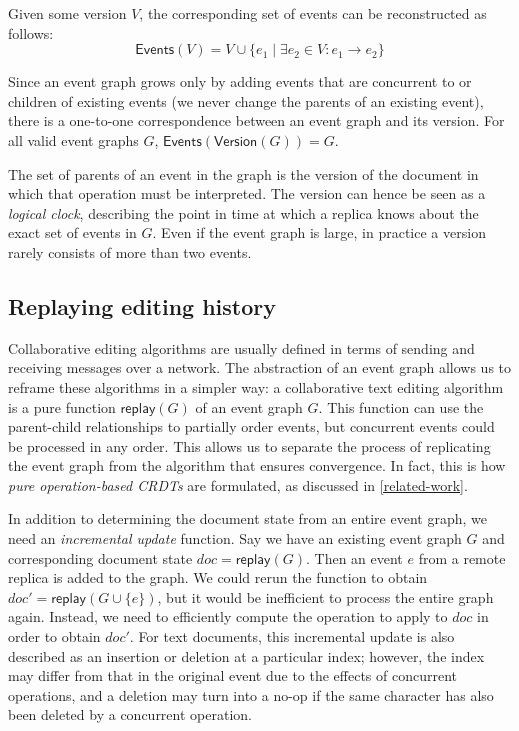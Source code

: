 \documentclass[sigplan,10pt]{acmart}
\begin{document}
Given some version $V$, the corresponding set of events can be reconstructed as follows:
\begin{equation*}
  \mathsf{Events}(V) = V \cup \{e_1 \mid \exists e_2 \in V : e_1 \rightarrow e_2\}
\end{equation*}

Since an event graph grows only by adding events that are concurrent to or children of existing events (we never change the parents of an existing event), there is a one-to-one correspondence between an event graph and its version.
For all valid event graphs $G$, $\mathsf{Events}(\mathsf{Version}(G)) = G$.

The set of parents of an event in the graph is the version of the document in which that operation must be interpreted.
The version can hence be seen as a \emph{logical clock}, describing the point in time at which a replica knows about the exact set of events in $G$.
Even if the event graph is large, in practice a version rarely consists of more than two events.

\subsection{Replaying editing history}\label{replay}

Collaborative editing algorithms are usually defined in terms of sending and receiving messages over a network.
The abstraction of an event graph allows us to reframe these algorithms in a simpler way: a collaborative text editing algorithm is a pure function $\mathsf{replay}(G)$ of an event graph $G$.
This function can use the parent-child relationships to partially order events, but concurrent events could be processed in any order.
This allows us to separate the process of replicating the event graph from the algorithm that ensures convergence.
In fact, this is how \emph{pure operation-based CRDTs} \cite{polog} are formulated, as discussed in \autoref{related-work}.

In addition to determining the document state from an entire event graph, we need an \emph{incremental update} function.
Say we have an existing event graph $G$ and corresponding document state $\mathit{doc} = \mathsf{replay}(G)$. Then an event $e$ from a remote replica is added to the graph.
We could rerun the function to obtain $\mathit{doc}' = \mathsf{replay}(G \cup \{e\})$, but it would be inefficient to process the entire graph again.
Instead, we need to efficiently compute the operation to apply to $\mathit{doc}$ in order to obtain $\mathit{doc}'$.
For text documents, this incremental update is also described as an insertion or deletion at a particular index; however, the index may differ from that in the original event due to the effects of concurrent operations, and a deletion may turn into a no-op if the same character has also been deleted by a concurrent operation.
\end{document}
